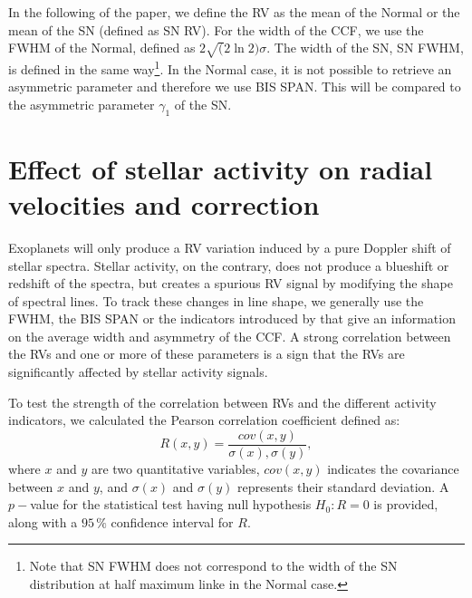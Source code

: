 \documentclass[11pt, oneside]{article}
\begin{document}
In the following of the paper, we define the RV as the mean of the Normal or the mean of the SN (defined as SN RV). For the width of the CCF, we use the FWHM of the Normal, defined as $2\sqrt(2\ln2)\sigma$. The width of the SN, SN FWHM, is defined in the same way\footnote{Note that SN FWHM does not correspond to the width of the SN distribution at half maximum linke in the Normal case.}. In the Normal case, it is not possible to retrieve an asymmetric parameter and therefore we use BIS SPAN. This will be compared to the asymmetric parameter $\gamma_1$ of the SN.

\section{Effect of stellar activity on radial velocities and correction} \label{sec:31}

Exoplanets will only produce a RV variation induced by a pure Doppler shift of stellar spectra. Stellar activity, on the contrary, does not produce a blueshift or redshift of the spectra, but creates a spurious RV signal by modifying the shape of spectral lines. To track these changes in line shape, we generally use the FWHM, the BIS SPAN or the indicators introduced by \citet{Figueira-2013} that give an information on the average width and asymmetry of the CCF. A strong correlation between the RVs and one or more of these parameters is a sign that the RVs are significantly affected by stellar activity signals.

To test the strength of the correlation between RVs and the different activity indicators, we calculated the Pearson correlation coefficient defined as:
%
\begin{equation}
R (x,y)= \frac{cov(x,y)}{\sigma(x),\sigma(y)},
\label{eq:Pearson:corr}
\end{equation}
where $x$ and $y$ are two quantitative variables, $cov(x,y)$ indicates the covariance between $x$ and $y$, and $\sigma(x)$ and $\sigma(y)$ represents their standard deviation. 
A $p-$value for the statistical test having null hypothesis $H_{0}: R=0$ is provided, along with a $95\,\%$ confidence interval for $R$.
%
\end{document}
